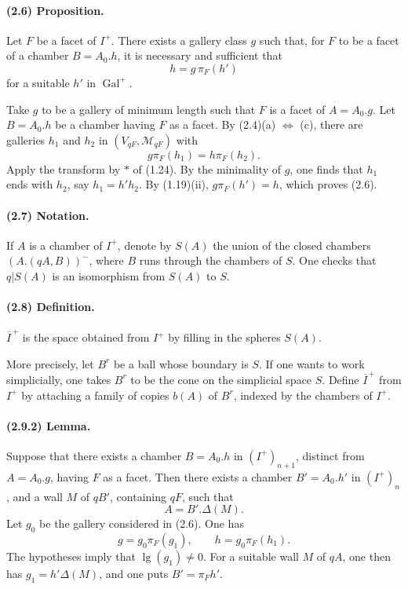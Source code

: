 \documentclass[10pt]{article}
\begin{document}
\paragraph{(2.6) Proposition.} Let \(F\) be a facet of \(I^+\). There exists a gallery class \(g\) such that, for \(F\) to be a facet of a chamber \(B=A_0.h\), it is necessary and sufficient that
\[
h=g\,\pi_F(h')
\]
for a suitable \(h'\) in \(\operatorname{Gal}^+\).

Take \(g\) to be a gallery of minimum length such that \(F\) is a facet of \(A=A_0.g\). Let \(B=A_0.h\) be a chamber having \(F\) as a facet. By (2.4)(a) \(\Leftrightarrow\) (c), there are galleries \(h_1\) and \(h_2\) in \((V_{qF},\mathcal M_{qF})\) with
\[
g\pi_F(h_1)=h\pi_F(h_2).
\]
Apply the transform by \(*\) of (1.24). By the minimality of \(g\), one finds that \(h_1\) ends with \(h_2\), say \(h_1=h'h_2\). By (1.19)(ii), \(g\pi_F(h')=h\), which proves (2.6).

\paragraph{(2.7) Notation.} If \(A\) is a chamber of \(I^+\), denote by \(S(A)\) the union of the closed chambers \((A.(qA,B))^{-}\), where \(B\) runs through the chambers of \(S\). One checks that \(q|S(A)\) is an isomorphism from \(S(A)\) to \(S\).

\paragraph{(2.8) Definition.} \(\overline I^{\, +}\) is the space obtained from \(I^+\) by filling in the spheres \(S(A)\).

More precisely, let \(B^r\) be a ball whose boundary is \(S\). If one wants to work simplicially, one takes \(B^r\) to be the cone on the simplicial space \(S\). Define \(\overline I^{\, +}\) from \(I^+\) by attaching a family of copies \(b(A)\) of \(B^r\), indexed by the chambers of \(I^+\).

\paragraph{(2.9.2) Lemma.} Suppose that there exists a chamber \(B=A_0.h\) in \((I^+)_{n+1}\), distinct from \(A=A_0.g\), having \(F\) as a facet. Then there exists a chamber \(B'=A_0.h'\) in \((I^+)_n\), and a wall \(M\) of \(qB'\), containing \(qF\), such that
\[
A=B'.\Delta(M).
\]
Let \(g_0\) be the gallery considered in (2.6). One has
\[
g=g_0\pi_F(g_1),\qquad h=g_0\pi_F(h_1).
\]
The hypotheses imply that \(\operatorname{lg}(g_1)\ne0\). For a suitable wall \(M\) of \(qA\), one then has \(g_1=h'\Delta(M)\), and one puts \(B'=\pi_Fh'\).
\end{document}
